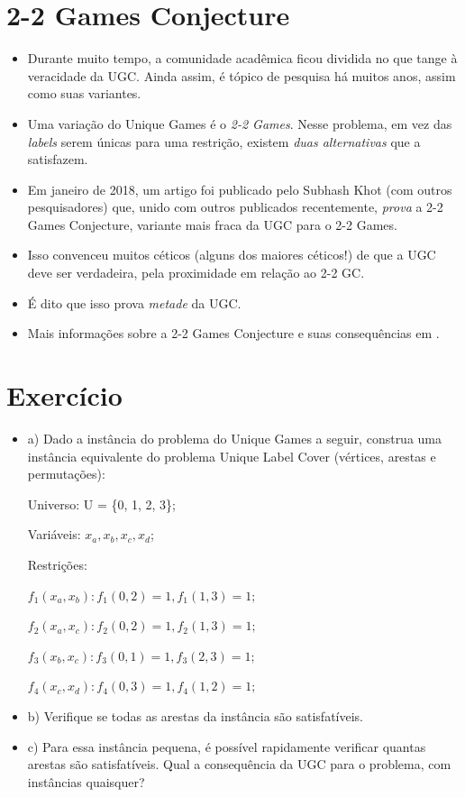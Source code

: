 \documentclass[12pt,a4paper]{article}
\begin{document}
\section{2-2 Games Conjecture}
\begin{itemize}
    \item Durante muito tempo, a comunidade acadêmica ficou dividida no que tange à veracidade da UGC. Ainda assim, é tópico de pesquisa há muitos anos, assim como suas variantes.
    \item Uma variação do Unique Games é o \emph{2-2 Games}. Nesse problema, em vez das \textit{labels} serem únicas para uma restrição, existem \emph{duas alternativas} que a satisfazem.
    \item Em janeiro de 2018, um artigo foi publicado pelo Subhash Khot (com outros pesquisadores) que, unido com outros publicados recentemente, \emph{prova} a 2-2 Games Conjecture, variante mais fraca da UGC para o 2-2 Games.
    \item Isso convenceu muitos céticos (alguns dos maiores céticos!) de que a UGC deve ser verdadeira, pela proximidade em relação ao 2-2 GC.
    \item É dito que isso prova \emph{metade} da UGC.
    \item Mais informações sobre a 2-2 Games Conjecture e suas consequências em \cite{history}.
\end{itemize}

\section*{Exercício}
    \begin{itemize}
        \item a) Dado a instância do problema do Unique Games a seguir, construa uma instância equivalente do problema Unique Label Cover (vértices, arestas e permutações):
    
    Universo: U = \{0, 1, 2, 3\};
    
    Variáveis: $x_a, x_b, x_c, x_d$;
    
    Restrições:
    
    $f_1(x_a,x_b): f_1(0,2) = 1,f_1(1,3) = 1;$
    
    $f_2(x_a,x_c): f_2(0,2) = 1,f_2(1,3) = 1;$
    
    $f_3(x_b,x_c): f_3(0,1) = 1,f_3(2,3) = 1;$
    
    $f_4(x_c,x_d): f_4(0,3) = 1,f_4(1,2) = 1;$
    
    \item b) Verifique se todas as arestas da instância são satisfatíveis.
    
    \item c) Para essa instância pequena, é possível rapidamente verificar quantas arestas são satisfatíveis. Qual a consequência da UGC para o problema, com instâncias quaisquer?
    \end{itemize}



\end{document}
